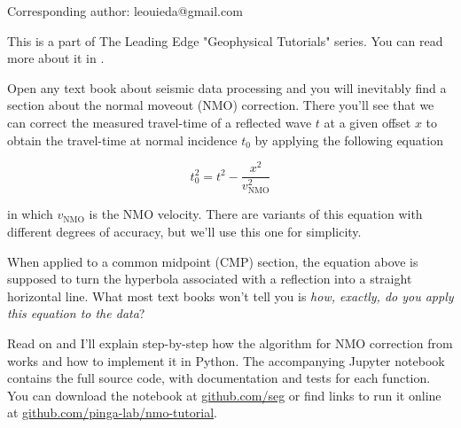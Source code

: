 Corresponding author: leouieda@gmail.com

This is a part of The Leading Edge "Geophysical Tutorials" series.
You can read more about it in \citet{Hall_2016a}.

Open any text book about seismic data processing and you will inevitably find a
section about the normal moveout (NMO) correction.
There you'll see that we can correct the measured travel-time of a reflected
wave $t$ at a given offset $x$ to obtain the travel-time at normal
incidence $t_0$ by applying the following equation 

\begin{equation}
t_0^2=t^2-\dfrac{x^2}{v_\mathrm{NMO}^2}
\label{eq:traveltime}
\end{equation}

in which $v_\mathrm{NMO}$ is the NMO velocity.
There are variants of this equation with different degrees of accuracy, 
but we'll use this one for simplicity.

When applied to a common midpoint (CMP) section, the equation above is
supposed to turn the hyperbola associated with a reflection into a straight
horizontal line.
What most text books won't tell you is \textit{how, exactly, do you apply this
equation to the data}?

Read on and I'll explain step-by-step how the algorithm for NMO correction from
\citet{Yilmaz_2001} works and how to implement it in Python.
The accompanying Jupyter notebook \citep{Perez_2007} contains the full source
code, with documentation and tests for each function.
You can download the notebook at
\href{https://github.com/seg}{github.com/seg} or
find links to run it online at
\href{https://github.com/pinga-lab/nmo-tutorial}{github.com/pinga-lab/nmo-tutorial}.
